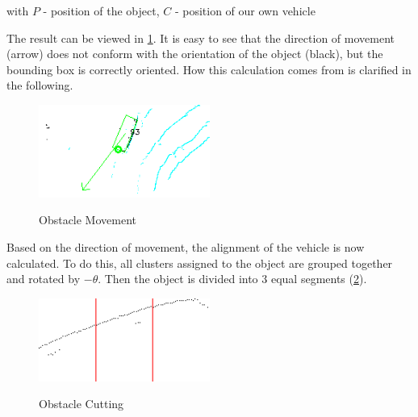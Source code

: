 \documentclass[11pt,oneside,openright]{mpreport}
\begin{document}
with $P$ - position of the object, $C$ - position of our own vehicle


The result can be viewed in \cref{obst_rot}. It is easy to see that the direction of movement (arrow) does not conform with the orientation of the object (black), 
but the bounding box is correctly oriented. How this calculation comes from is clarified in the following.

\begin{figure}[!ht]
\caption{Obstacle Movement}
\includegraphics[width=0.5\textwidth]{bilder/obst_rot.png}
\label{obst_rot}
\end{figure}


Based on the direction of movement, the alignment of the vehicle is now calculated. To do this, all clusters assigned to the object are grouped together and rotated by $-\theta$.
Then the object is divided into 3 equal segments (\cref{obst_devide}).

\begin{figure}[!ht]
\caption{Obstacle Cutting}
\includegraphics[width=0.5\textwidth]{bilder/obst_devide.png}
\label{obst_devide}
\end{figure}
\end{document}
